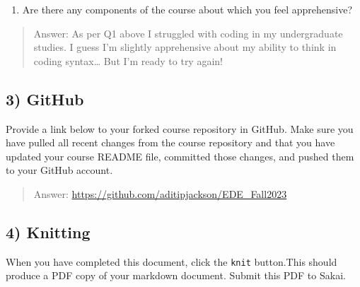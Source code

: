 \documentclass[
]{article}
\providecommand{\tightlist}{%
  \setlength{\itemsep}{0pt}\setlength{\parskip}{0pt}}
\begin{document}
\begin{enumerate}
\def\labelenumi{\arabic{enumi}.}
\setcounter{enumi}{2}
\tightlist
\item
  Are there any components of the course about which you feel
  apprehensive?
\end{enumerate}

\begin{quote}
Answer: As per Q1 above I struggled with coding in my undergraduate
studies. I guess I'm slightly apprehensive about my ability to think in
coding syntax\ldots{} But I'm ready to try again!
\end{quote}

\hypertarget{github}{%
\subsection{3) GitHub}\label{github}}

Provide a link below to your forked course repository in GitHub. Make
sure you have pulled all recent changes from the course repository and
that you have updated your course README file, committed those changes,
and pushed them to your GitHub account.

\begin{quote}
Answer: \url{https://github.com/aditipjackson/EDE_Fall2023}
\end{quote}

\hypertarget{knitting}{%
\subsection{4) Knitting}\label{knitting}}

When you have completed this document, click the \texttt{knit}
button.This should produce a PDF copy of your markdown document. Submit
this PDF to Sakai.
\end{document}
